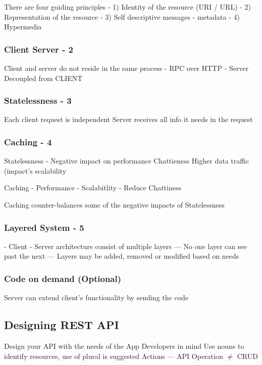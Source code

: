 \documentclass[a4paper, 11pt]{book}
\begin{document}
    There are four guiding principles
    - 1) Identity of the resource (URI / URL)
    - 2) Representation of the resource
    - 3) Self descriptive messages - metadata
    - 4) Hypermedia

    \subsubsection{Client Server - 2}
    Client and server do not reside in the same process
    - RPC over HTTP
    - Server Decoupled from CLIENT

    \subsubsection{Statelessness - 3}
    Each client request is independent
    Server receives all info it needs in the request

    \subsubsection{Caching - 4}
    Statelessness - Negative impact on performance
    Chattieness
    Higher data traffic (impact's scalability

    Caching - Performance
    - Scalabitlity
    - Reduce Chattiness

    Caching counter-balances some of the negative impacts of Statelessness

    \subsubsection{Layered System - 5}
    - Client - Server architecture consist of multiple layers
    --- No one layer can see past the next
    --- Layers may be added, removed or modified based on needs

    \subsubsection{Code on demand (Optional)}
    Server can extend client's functionality by sending the code

    \subsection{Designing REST API}
    Design your API with the needs of the App Developers in mind
    Use nouns to identify resources, use of plural is suggested
    Actions
    --- API Operation $ \neq $ CRUD
\end{document}
